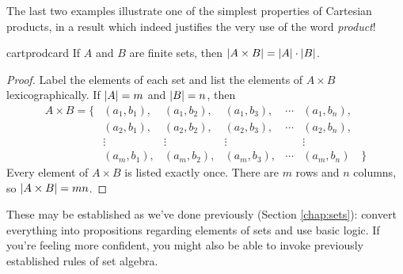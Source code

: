 
The last two examples illustrate one of the simplest properties of Cartesian products, in a result which indeed justifies the very use of the word \emph{product}!

\begin{thm}{}{cartprodcard}
	If $A$ and $B$ are finite sets, then $\left| A\times B\right|=\left| A\right|\cdot\left| B\right|$.
\end{thm}

\begin{proof}
	Label the elements of each set and list the elements of $A\times B$ lexicographically. If $\left| A\right|=m$ and $\left| B\right|=n$, then
	\[
		\begin{array}{rccccccl}
			A\times B=\big\{&(a_1,b_1),&(a_1,b_2),&(a_1,b_3),&\cdots&(a_1,b_n),&\\
			&(a_2,b_1),&(a_2,b_2),&(a_2,b_3),&\cdots&(a_2,b_n),&\\
			&\vdots&\vdots&\vdots&&\vdots&\\
			&(a_m,b_1),&(a_m,b_2),&(a_m,b_3),&\cdots&(a_m,b_n)&\big\}
		\end{array}
	\]
	Every element of $A\times B$ is listed exactly once. There are $m$ rows and $n$ columns, so $\left| A\times B\right|=mn$.
\end{proof}



These may be established as we've done previously (Section \ref{chap:sets}): convert everything into propositions regarding elements of sets and use basic logic. If you're feeling more confident, you might also be able to invoke previously established rules of set algebra.

